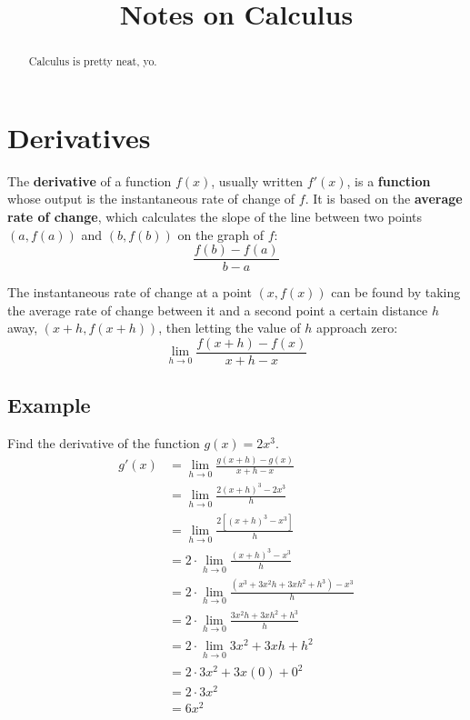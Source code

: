 \documentclass[12pt, letterpaper]{article}
\title{Notes on Calculus}
\author{}
\date{}
\begin{document}
\maketitle

\begin{abstract}
    Calculus is pretty neat, yo.
\end{abstract}

\section{Derivatives}
The \textbf{derivative} of a function $f(x)$, usually written $f'(x)$, is a \textbf{function} whose output is the instantaneous rate of change of $f$. It is based on the \textbf{average rate of change}, which calculates the slope of the line between two points $(a, f(a))$ and $(b, f(b))$ on the graph of $f$:
\begin{equation*}
    \frac{f(b)-f(a)}{b-a}
\end{equation*}

The instantaneous rate of change at a point $(x, f(x))$ can be found by taking the average rate of change between it and a second point a certain distance $h$ away, $(x+h, f(x+h))$, then letting the value of $h$ approach zero:
\begin{equation*}
    \lim_{h \to 0} \frac{f(x+h)-f(x)}{x+h-x}
\end{equation*}

\subsection{Example}
Find the derivative of the function $g(x)=2x^3$.
\begin{align*}
    g'(x)
    &= \lim_{h \to 0} \frac{g(x+h)-g(x)}{x+h-x} \\
    &= \lim_{h \to 0} \frac{2(x+h)^3-2x^3}{h} \\
    &= \lim_{h \to 0} \frac{2[(x+h)^3-x^3]}{h} \\
    &= 2 \cdot \lim_{h \to 0} \frac{(x+h)^3-x^3}{h} \\
    &= 2 \cdot \lim_{h \to 0} \frac{(x^3+3x^2h+3xh^2+h^3)-x^3}{h} \\
    &= 2 \cdot \lim_{h \to 0} \frac{3x^2h+3xh^2+h^3}{h} \\
    &= 2 \cdot \lim_{h \to 0} 3x^2+3xh+h^2 \\
    &= 2 \cdot 3x^2+3x(0)+0^2 \\
    &= 2 \cdot 3x^2 \\
    &= \boxed{6x^2}
\end{align*}
\end{document}
